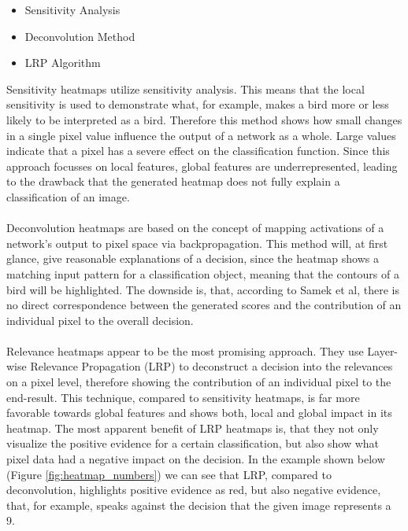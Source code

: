 \documentclass{acmsiggraph}               %
\begin{document}
\begin{itemize}
  \setlength\itemsep{0em}
  \item Sensitivity Analysis
  \item Deconvolution Method
  \item LRP Algorithm
\end{itemize}

Sensitivity heatmaps utilize sensitivity analysis. This means that the local sensitivity is used to demonstrate what, for example, makes a bird more or less likely to be interpreted as a bird. Therefore this method shows how small changes in a single pixel value influence the output of a network as a whole. Large values indicate that a pixel has a severe effect on the classification function. Since this approach focusses on local features, global features are underrepresented, leading to the drawback that the generated heatmap does not fully explain a classification of an image.\\\\
Deconvolution heatmaps are based on the concept of mapping activations of a network's output to pixel space via backpropagation. This method will, at first glance, give reasonable explanations of a decision, since the heatmap shows a matching input pattern for a classification object, meaning that the contours of a bird will be highlighted. The downside is, that, according to Samek et al, there is no direct correspondence between the generated scores and the contribution of an individual pixel to the overall decision.\\\\
Relevance heatmaps appear to be the most promising approach. They use Layer-wise Relevance Propagation (LRP) to deconstruct a decision into the relevances on a pixel level, therefore showing the contribution of an individual pixel to the end-result. This technique, compared to sensitivity heatmaps, is far more favorable towards global features and shows both, local and global impact in its heatmap. The most apparent benefit of LRP heatmaps is, that they not only visualize the positive evidence for a certain classification, but also show what pixel data had a negative impact on the decision. In the example shown below (Figure \ref{fig:heatmap_numbers}) we can see that LRP, compared to deconvolution, highlights positive evidence as red, but also negative evidence, that, for example, speaks against the decision that the given image represents a 9.
\end{document}
